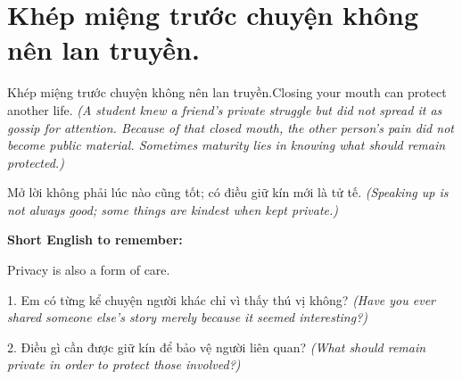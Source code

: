 \section{Khép miệng trước chuyện không nên lan truyền.}
\begin{truyen}{Khép miệng trước chuyện không nên lan truyền.}{Closing your mouth can protect another life.}
\textit{(A student knew a friend's private struggle but did not spread it as gossip for attention. Because of that closed mouth, the other person's pain did not become public material. Sometimes maturity lies in knowing what should remain protected.)}
\end{truyen}
\begin{baihoc}
Mở lời không phải lúc nào cũng tốt; có điều giữ kín mới là tử tế.
\textit{(Speaking up is not always good; some things are kindest when kept private.)}
\end{baihoc}
\begin{ghinhoanh}
\textbf{Short English to remember:}

Privacy is also a form of care.
\end{ghinhoanh}
\begin{tuhocnhanh}
1. Em có từng kể chuyện người khác chỉ vì thấy thú vị không? \textit{(Have you ever shared someone else's story merely because it seemed interesting?)}

2. Điều gì cần được giữ kín để bảo vệ người liên quan? \textit{(What should remain private in order to protect those involved?)}
\end{tuhocnhanh}
\ngancach

